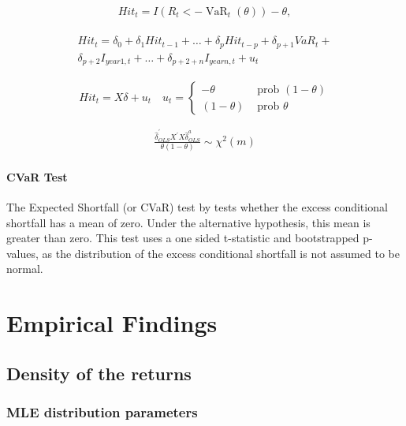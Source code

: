 \documentclass[a4paper, nobind]{templates/ociamthesis}
\begin{document}
\begin{align}
Hit_{t}=I\left(R_{t}<-\operatorname{VaR}_{t}(\theta)\right)-\theta,
\label{eq:dq1}
\end{align}

\begin{align}
\begin{array}{c}
Hit_{t}=\delta_{0}+\delta_{1} H i t_{t-1}+\ldots+\delta_{p} Hit_{t-p}+\delta_{p+1} VaR_{t}+ \\
\delta_{p+2} I_{year1, t}+\ldots+\delta_{p+2+n} I_{year n, t}+u_{t} \end{array}
\label{eq:dq2}
\end{align}

\[Hit_{t}=X \delta+u_{t} \quad u_{t}=\left\{\begin{array}{ll}
-\theta & \text { prob }(1-\theta) \\
(1-\theta) & \text { prob } \theta
\end{array}\right.\]

\begin{align}
\frac{\hat{\delta}_{O L S}^{\prime} X^{\prime} X \hat{\delta}_{O L S}^{a}}{\theta(1-\theta)} \sim \chi^{2}(m)
\label{eq:dq3}
\end{align}

\hypertarget{cvar-test}{%
\subsubsection{CVaR Test}\label{cvar-test}}

The Expected Shortfall (or CVaR) test by \textcite{mcneil2000} tests whether the excess conditional shortfall has a mean of zero. Under the alternative hypothesis, this mean is greater than zero. This test uses a one sided t-statistic and bootstrapped p-values, as the distribution of the excess conditional shortfall is not assumed to be normal.

\hypertarget{analysis}{%
\chapter{Empirical Findings}\label{analysis}}

\minitoc 

\hypertarget{density-of-the-returns}{%
\section{Density of the returns}\label{density-of-the-returns}}

\hypertarget{mle-distribution-parameters}{%
\subsection{MLE distribution parameters}\label{mle-distribution-parameters}}
\end{document}
